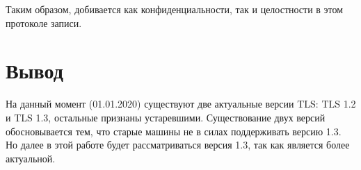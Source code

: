     Таким образом, добивается как конфиденциальности, так и целостности в этом протоколе записи.    
        
    \section{Вывод}

        На данный момент (01.01.2020) существуют две актуальные версии TLS: TLS 1.2 и TLS 1.3, остальные признаны устаревшими. Существование двух версий обосновывается тем, что старые машины не в силах поддерживать версию 1.3. Но далее в этой работе будет рассматриваться версия 1.3, так как является более актуальной.
